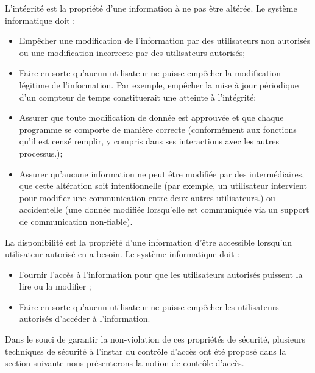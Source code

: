 \label{sectionIntégrité}

L'intégrité est la propriété d'une information à ne pas être altérée. Le système informatique doit \cite{theseBenoit} :
\begin{itemize}
\item Empêcher une modification de l'information par des utilisateurs non autorisés ou une modification incorrecte par des utilisateurs autorisés; 
\item Faire en sorte qu'aucun utilisateur ne puisse empêcher la modification légitime de l'information. Par exemple, empêcher la mise à jour périodique d'un compteur de temps constituerait une atteinte à l'intégrité; 
\item Assurer que toute modification de donnée est approuvée et que chaque programme se comporte de manière correcte (conformément aux fonctions qu'il est censé remplir, y compris dans ses interactions avec les autres processus.); 
\item Assurer qu'aucune information ne peut être modifiée par des intermédiaires, que cette altération soit intentionnelle (par exemple, un utilisateur intervient pour modifier une communication entre deux autres utilisateurs.) ou accidentelle (une donnée modifiée lorsqu'elle est communiquée via un support de communication non-fiable).
\end{itemize}

\label{sectionDisponibilité}
La disponibilité est la propriété d'une information d'être accessible lorsqu'un utilisateur autorisé en a besoin. Le système informatique doit \cite{theseBenoit}:
\begin{itemize}

\item Fournir l'accès à l'information pour que les utilisateurs autorisés puissent la lire ou la modifier ; 
\item Faire en sorte qu'aucun utilisateur ne puisse empêcher les utilisateurs autorisés d'accéder à l'information.
\end{itemize}

\hspace*{0.5cm} Dans le souci de garantir la non-violation de ces propriétés de sécurité, plusieurs techniques de sécurité à l'instar du contrôle d'accès ont été proposé dans la section suivante nous présenterons la notion de contrôle d'accès.

\label{sectionContrôle}

\label{sectionDéfinition}

